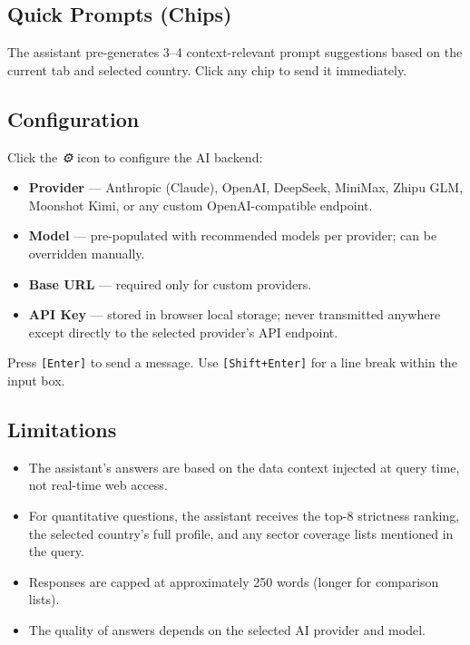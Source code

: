 \documentclass[12pt,a4paper]{article}
\newcommand{\keycap}[1]{%
  \texttt{\footnotesize[#1]}%
}
\newcommand{\uielem}[1]{\textit{#1}}
\begin{document}
\subsection{Quick Prompts (Chips)}

The assistant pre-generates 3--4 context-relevant prompt suggestions based on the current tab and selected country. Click any chip to send it immediately.

\subsection{Configuration}

Click the \uielem{⚙} icon to configure the AI backend:

\begin{itemize}
  \item \textbf{Provider} — Anthropic (Claude), OpenAI, DeepSeek, MiniMax, Zhipu GLM, Moonshot Kimi, or any custom OpenAI-compatible endpoint.
  \item \textbf{Model} — pre-populated with recommended models per provider; can be overridden manually.
  \item \textbf{Base URL} — required only for custom providers.
  \item \textbf{API Key} — stored in browser local storage; never transmitted anywhere except directly to the selected provider's API endpoint.
\end{itemize}

\begin{tipbox}
Press \keycap{Enter} to send a message. Use \keycap{Shift+Enter} for a line break within the input box.
\end{tipbox}

\subsection{Limitations}

\begin{itemize}
  \item The assistant's answers are based on the data context injected at query time, not real-time web access.
  \item For quantitative questions, the assistant receives the top-8 strictness ranking, the selected country's full profile, and any sector coverage lists mentioned in the query.
  \item Responses are capped at approximately 250 words (longer for comparison lists).
  \item The quality of answers depends on the selected AI provider and model.
\end{itemize}
\end{document}
